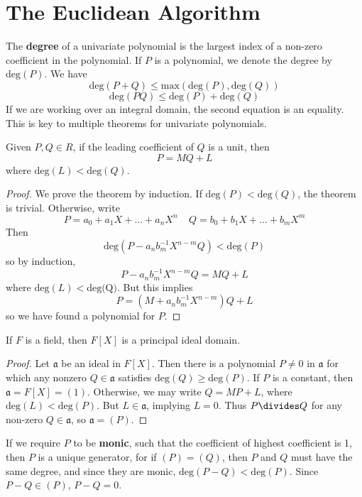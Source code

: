 \section{The Euclidean Algorithm}

The {\bf degree} of a univariate polynomial is the largest index of a non-zero coefficient in the polynomial. If $P$ is a polynomial, we denote the degree by $\text{deg}(P)$. We have
%
\[ \text{deg}(P + Q) \leq \text{max}(\text{deg}(P), \text{deg}(Q)) \]
%
%
\[ \text{deg}(PQ) \leq \text{deg}(P) + \text{deg}(Q) \]
%
If we are working over an integral domain, the second equation is an equality. This is key to multiple theorems for univariate polynomials.

\begin{theorem}
    Given $P,Q \in R$, if the leading coefficient of $Q$ is a unit, then
    \[ P = MQ + L \]
    where $\text{deg}(L) < \text{deg}(Q)$.
\end{theorem}
\begin{proof}
    We prove the theorem by induction. If $\text{deg}(P) < \text{deg}(Q)$, the theorem is trivial. Otherwise, write
    \[ P = a_0 + a_1 X + \dots + a_n X^n\ \ \ \ \ Q = b_0 + b_1 X + \dots + b_m X^m \]
    Then
    \[ \text{deg}(P - a_n b_m^{-1} X^{n - m} Q) < \text{deg}(P) \]
    so by induction,
    \[ P - a_n b_m^{-1} X^{n-m} Q = MQ + L \]
    where $\text{deg}(L) < \text{deg(Q)}$. But this implies
    \[ P = (M + a_n b_m^{-1} X^{n-m}) Q + L \]
    so we have found a polynomial for $P$.
\end{proof}

\begin{corollary}
    If $F$ is a field, then $F[X]$ is a principal ideal domain.
\end{corollary}
\begin{proof}
    Let $\mathfrak{a}$ be an ideal in $F[X]$. Then there is a polynomial $P \neq 0$ in $\mathfrak{a}$ for which any nonzero $Q \in \mathfrak{a}$ satisfies $\text{deg}(Q) \geq \text{deg}(P)$. If $P$ is a constant, then $\mathfrak{a} = F[X] = (1)$. Otherwise, we may write $Q = MP + L$, where $\text{deg}(L) < \text{deg}(P)$. But $L \in \mathfrak{a}$, implying $L = 0$. Thus $P \divides Q$ for any non-zero $Q \in \mathfrak{a}$, so $\mathfrak{a} = (P)$.
\end{proof}

If we require $P$ to be {\bf monic}, such that the coefficient of highest coefficient is 1, then $P$ is a unique generator, for if $(P) = (Q)$, then $P$ and $Q$ must have the same degree, and since they are monic, $\text{deg}(P - Q) < \text{deg}(P)$. Since $P - Q \in (P)$, $P - Q = 0$.


